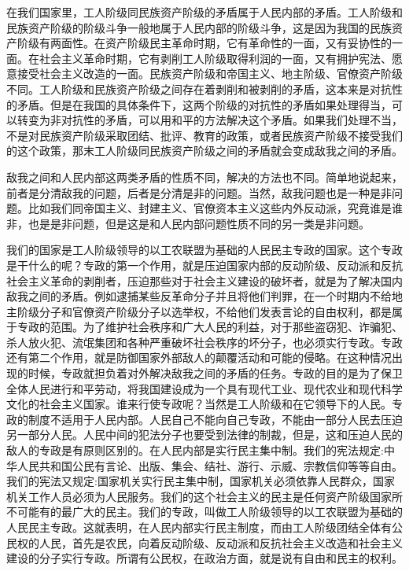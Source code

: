 在我们国家里，工人阶级同民族资产阶级的矛盾属于人民内部的矛盾。工人阶级和民族资产阶级的阶级斗争一般地属于人民内部的阶级斗争，这是因为我国的民族资产阶级有两面性。在资产阶级民主革命时期，它有革命性的一面，又有妥协性的一面。在社会主义革命时期，它有剥削工人阶级取得利润的一面，又有拥护宪法、愿意接受社会主义改造的一面。民族资产阶级和帝国主义、地主阶级、官僚资产阶级不同。工人阶级和民族资产阶级之间存在着剥削和被剥削的矛盾，这本来是对抗性的矛盾。但是在我国的具体条件下，这两个阶级的对抗性的矛盾如果处理得当，可以转变为非对抗性的矛盾，可以用和平的方法解决这个矛盾。如果我们处理不当，不是对民族资产阶级采取团结、批评、教育的政策，或者民族资产阶级不接受我们的这个政策，那末工人阶级同民族资产阶级之间的矛盾就会变成敌我之间的矛盾。

敌我之间和人民内部这两类矛盾的性质不同，解决的方法也不同。简单地说起来，前者是分清敌我的问题，后者是分清是非的问题。当然，敌我问题也是一种是非问题。比如我们同帝国主义、封建主义、官僚资本主义这些内外反动派，究竟谁是谁非，也是是非问题，但是这是和人民内部问题性质不同的另一类是非问题。

我们的国家是工人阶级领导的以工农联盟为基础的人民民主专政的国家。这个专政是干什么的呢？专政的第一个作用，就是压迫国家内部的反动阶级、反动派和反抗社会主义革命的剥削者，压迫那些对于社会主义建设的破坏者，就是为了解决国内敌我之间的矛盾。例如逮捕某些反革命分子并且将他们判罪，在一个时期内不给地主阶级分子和官僚资产阶级分子以选举权，不给他们发表言论的自由权利，都是属于专政的范围。为了维护社会秩序和广大人民的利益，对于那些盗窃犯、诈骗犯、杀人放火犯、流氓集团和各种严重破坏社会秩序的坏分子，也必须实行专政。专政还有第二个作用，就是防御国家外部敌人的颠覆活动和可能的侵略。在这种情况出现的时候，专政就担负着对外解决敌我之间的矛盾的任务。专政的目的是为了保卫全体人民进行和平劳动，将我国建设成为一个具有现代工业、现代农业和现代科学文化的社会主义国家。谁来行使专政呢？当然是工人阶级和在它领导下的人民。专政的制度不适用于人民内部。人民自己不能向自己专政，不能由一部分人民去压迫另一部分人民。人民中间的犯法分子也要受到法律的制裁，但是，这和压迫人民的敌人的专政是有原则区别的。在人民内部是实行民主集中制。我们的宪法规定:中华人民共和国公民有言论、出版、集会、结社、游行、示威、宗教信仰等等自由。我们的宪法又规定:国家机关实行民主集中制，国家机关必须依靠人民群众，国家机关工作人员必须为人民服务。我们的这个社会主义的民主是任何资产阶级国家所不可能有的最广大的民主。我们的专政，叫做工人阶级领导的以工农联盟为基础的人民民主专政。这就表明，在人民内部实行民主制度，而由工人阶级团结全体有公民权的人民，首先是农民，向着反动阶级、反动派和反抗社会主义改造和社会主义建设的分子实行专政。所谓有公民权，在政治方面，就是说有自由和民主的权利。

